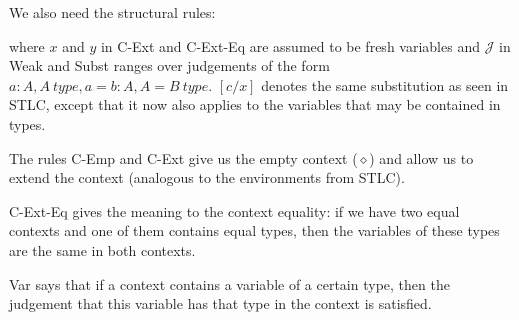 We also need the structural rules:

\begin{definition}

where $x$ and $y$ in C-Ext and C-Ext-Eq are assumed to be fresh variables and
$\mathcal{J}$ in Weak and Subst ranges over judgements of the form $a : A,
A~type, a = b: A, A = B~type$. $[c/x]$ denotes the same substitution as seen in
STLC, except that it now also applies to the variables that may be contained in
types.
\end{definition}

The rules C-Emp and C-Ext give us the empty context ($\diamond$) and allow us
to extend the context (analogous to the environments from STLC).

C-Ext-Eq gives the meaning to the context equality: if we have two equal
contexts and one of them contains equal types, then the variables of these
types are the same in both contexts.

Var says that if a context contains a variable of a certain type, then the
judgement that this variable has that type in the context is satisfied.

